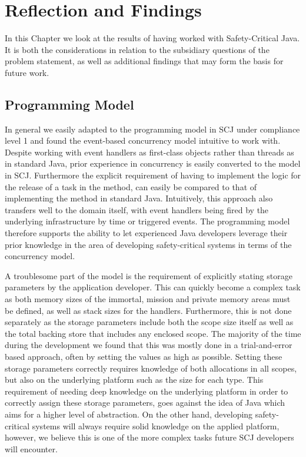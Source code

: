 \chapter{Reflection and Findings}
\label{chapter:Reflection}
In this Chapter we look at the results of having worked with Safety-Critical Java. It is both the considerations in relation to the subsidiary questions of the problem statement, as well as additional findings that may form the basis for future work.

\section{Programming Model} 
\label{sec:programming_model}
In general we easily adapted to the programming model in SCJ under compliance level 1 and found the event-based concurrency model intuitive to work with. Despite working with event handlers as first-class objects rather than threads as in standard Java, prior experience in concurrency is easily converted to the model in SCJ. Furthermore the explicit requirement of having to implement the logic for the release of a task in the  method, can easily be compared to that of implementing the  method in standard Java. Intuitively, this approach also transfers well to the domain itself, with event handlers being fired by the underlying infrastructure by time or triggered events. The programming model therefore supports the ability to let experienced Java developers leverage their prior knowledge in the area of developing safety-critical systems in terms of the concurrency model.

A troublesome part of the model is the requirement of explicitly stating storage parameters by the application developer. This can quickly become a complex task as both memory sizes of the immortal, mission and private memory areas must be defined, as well as stack sizes for the handlers. Furthermore, this is not done separately as the storage parameters include both the scope size itself as well as the total backing store that includes any enclosed scope. The majority of the time during the development we found that this was mostly done in a trial-and-error based approach, often by setting the values as high as possible. Setting these storage parameters correctly requires knowledge of both allocations in all scopes, but also on the underlying platform such as the size for each type. This requirement of needing deep knowledge on the underlying platform in order to correctly assign these storage parameters, goes against the idea of Java which aims for a higher level of abstraction. On the other hand, developing safety-critical systems will always require solid knowledge on the applied platform, however, we believe this is one of the more complex tasks future SCJ developers will encounter.


